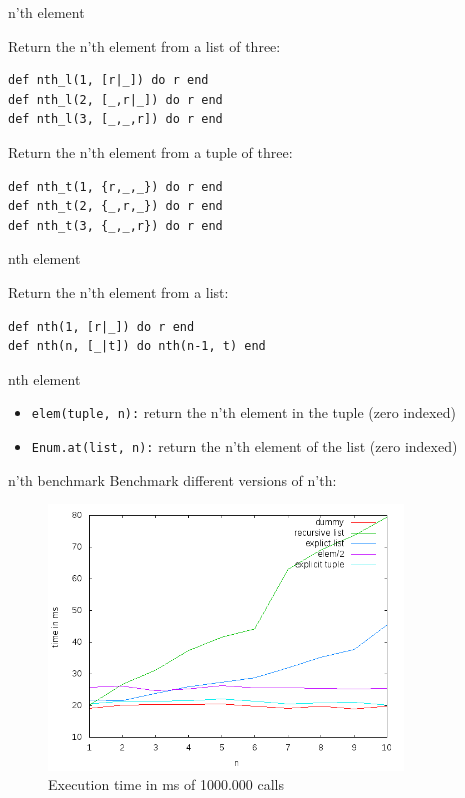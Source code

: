 \begin{frame}[fragile]{n'th element}

Return the n'th element from a list of three:

\pause 
\begin{verbatim}
def nth_l(1, [r|_]) do r end
def nth_l(2, [_,r|_]) do r end
def nth_l(3, [_,_,r]) do r end
\end{verbatim}

\pause Return the n'th element from a tuple of three:
\pause

\begin{verbatim}
def nth_t(1, {r,_,_}) do r end
def nth_t(2, {_,r,_}) do r end
def nth_t(3, {_,_,r}) do r end
\end{verbatim}

\end{frame}

\begin{frame}[fragile]{nth element}

Return the n'th element from a list:

\pause 
\begin{verbatim}
def nth(1, [r|_]) do r end
def nth(n, [_|t]) do nth(n-1, t) end
\end{verbatim}

\end{frame}


\begin{frame}{nth element}

\begin{itemize}
  \item {\tt elem(tuple, n):} return the n'th element in the tuple (zero indexed)
  \item {\tt Enum.at(list, n):} return the n'th element of the list (zero indexed)
\end{itemize}

\end{frame}

\begin{frame}{n'th benchmark}
Benchmark different versions of n'th:
 \begin{figure}
  \centering
  \includegraphics[height=200pt]{bench.png}
  \caption{Execution time in ms of 1000.000 calls}
 \end{figure}

\end{frame}

